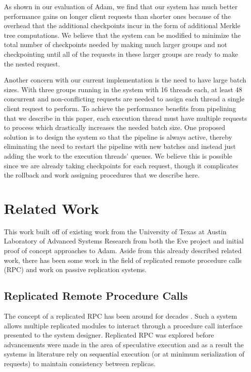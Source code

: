\documentclass[11pt, oneside]{report}
\begin{document}
As shown in our evaluation of Adam, we find that our system has much better performance gains on longer client requests than shorter ones because of the overhead that the additional checkpoints incur in the form of additional Merkle tree computations.
We believe that the system can be modified to minimize the total number of checkpoints needed by making much larger groups and not checkpointing until all of the requests in these larger groups are ready to make the nested request.

Another concern with our current implementation is the need to have large batch sizes. 
With three groups running in the system with 16 threads each, at least 48 concurrent and non-conflicting requests are needed to assign each thread a single client request to perform. 
To achieve the performance benefits from pipelining that we describe in this paper, each execution thread must have multiple requests to process which drastically increases the needed batch size. 
One proposed solution is to design the system so that the pipeline is always active, thereby eliminating the need to restart the pipeline with new batches and instead just adding the work to the execution threads' queues.
We believe this is possible since we are already taking checkpoints for each request, though it complicates the rollback and work assigning procedures that we describe here.

\chapter{Related Work}\label{RelatedWork}

This work built off of existing work from the University of Texas at Austin Laboratory of Advanced Systems Research from both the Eve project and initial proof of concept approaches to Adam. Aside from this already described related work, there has been some work in the field of replicated remote procedure calls (RPC) and work on passive replication systems.

\section{Replicated Remote Procedure Calls}

The concept of a replicated RPC has been around for decades \cite{rrpc, ftrpc}.
Such a system allows multiple replicated modules to interact through a procedure call interface presented to the system designer.
Replicated RPC was explored before advancements were made in the area of speculative execution and as a result the systems in literature rely on sequential execution (or at minimum serialization of requests) to maintain consistency between replicas. 
\end{document}
